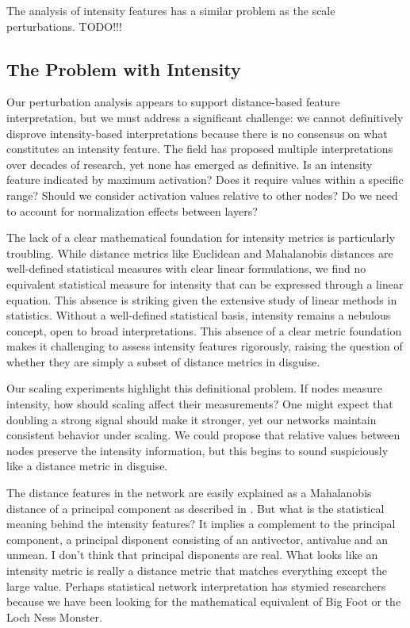 The analysis of intensity features has a similar problem as the scale perturbations. TODO!!!

\subsection{The Problem with Intensity}

Our perturbation analysis appears to support distance-based feature interpretation, but we must address a significant challenge: we cannot definitively disprove intensity-based interpretations because there is no consensus on what constitutes an intensity feature. The field has proposed multiple interpretations over decades of research, yet none has emerged as definitive. Is an intensity feature indicated by maximum activation? Does it require values within a specific range? Should we consider activation values relative to other nodes? Do we need to account for normalization effects between layers?

The lack of a clear mathematical foundation for intensity metrics is particularly troubling. While distance metrics like Euclidean and Mahalanobis distances are well-defined statistical measures with clear linear formulations, we find no equivalent statistical measure for intensity that can be expressed through a linear equation. This absence is striking given the extensive study of linear methods in statistics. Without a well-defined statistical basis, intensity remains a nebulous concept, open to broad interpretations. This absence of a clear metric foundation makes it challenging to assess intensity features rigorously, raising the question of whether they are simply a subset of distance metrics in disguise.

Our scaling experiments highlight this definitional problem. If nodes measure intensity, how should scaling affect their measurements? One might expect that doubling a strong signal should make it stronger, yet our networks maintain consistent behavior under scaling. We could propose that relative values between nodes preserve the intensity information, but this begins to sound suspiciously like a distance metric in disguise.

The distance features in the network are easily explained as a Mahalanobis distance of a principal component as described in \cite{oursland2024interpreting}. But what is the statistical meaning behind the intensity features? It implies a complement to the principal component, a principal disponent consisting of an antivector, antivalue and an unmean. I don't think that principal disponents are real. What looks like an intensity metric is really a distance metric that matches everything except the large value. Perhaps statistical network interpretation has stymied researchers because we have been looking for the mathematical equivalent of Big Foot or the Loch Ness Monster.
